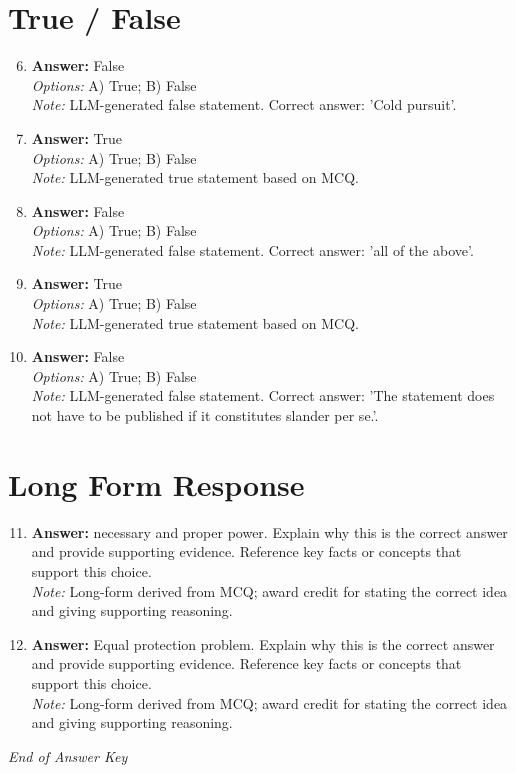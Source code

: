 \documentclass[12pt]{article}
\begin{document}
\section*{True / False}
\begin{enumerate}[label=\arabic*.]
\setcounter{enumi}{5}
\item \textbf{Answer:} False
\\ \textit{Options:} A) True; B) False
\\ \textit{Note:} LLM-generated false statement. Correct answer: 'Cold pursuit'.
\item \textbf{Answer:} True
\\ \textit{Options:} A) True; B) False
\\ \textit{Note:} LLM-generated true statement based on MCQ.
\item \textbf{Answer:} False
\\ \textit{Options:} A) True; B) False
\\ \textit{Note:} LLM-generated false statement. Correct answer: 'all of the above'.
\item \textbf{Answer:} True
\\ \textit{Options:} A) True; B) False
\\ \textit{Note:} LLM-generated true statement based on MCQ.
\item \textbf{Answer:} False
\\ \textit{Options:} A) True; B) False
\\ \textit{Note:} LLM-generated false statement. Correct answer: 'The statement does not have to be published if it constitutes slander per se.'.
\end{enumerate}

\section*{Long Form Response}
\begin{enumerate}[label=\arabic*.]
\setcounter{enumi}{10}
\item \textbf{Answer:} necessary and proper power. Explain why this is the correct answer and provide supporting evidence. Reference key facts or concepts that support this choice.
\\ \textit{Note:} Long-form derived from MCQ; award credit for stating the correct idea and giving supporting reasoning.
\item \textbf{Answer:} Equal protection problem. Explain why this is the correct answer and provide supporting evidence. Reference key facts or concepts that support this choice.
\\ \textit{Note:} Long-form derived from MCQ; award credit for stating the correct idea and giving supporting reasoning.
\end{enumerate}

\vfill
\noindent\textit{End of Answer Key}
\end{document}
